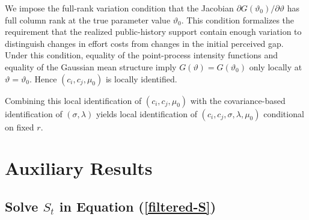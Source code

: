 \documentclass[mnsc]{informs3}
\begin{document}
\begin{APPENDICES}
We impose the full-rank variation condition that the Jacobian
$\partial G(\vartheta_0)/\partial\vartheta$ has full column rank at the true parameter value $\vartheta_0$.
This condition formalizes the requirement that the realized public-history support contain enough variation to distinguish changes in effort costs from changes in the initial perceived gap.
Under this condition, equality of the point-process intensity functions and equality of the Gaussian mean structure imply $G(\vartheta)=G(\vartheta_0)$ only locally at $\vartheta=\vartheta_0$.
Hence $(c_i,c_j,\mu_0)$ is locally identified.

Combining this local identification of $(c_i,c_j,\mu_0)$ with the covariance-based identification of $(\sigma,\lambda)$ yields local identification of $(c_i,c_j,\sigma,\lambda,\mu_0)$ conditional on fixed $r$.
\Halmos
\endproof






\section{Auxiliary Results}

\subsection{Solve $S_t$ in Equation (\ref{filtered-S})}\label{app-S-equ}


\end{APPENDICES}
\end{document}

